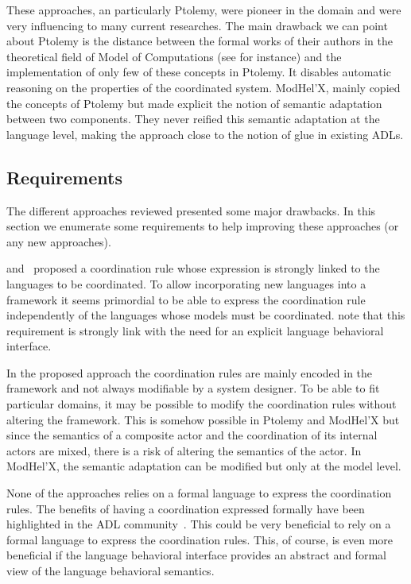 These approaches, an particularly Ptolemy, were pioneer in the domain and were very influencing to many current researches. The main drawback we can point about Ptolemy is the distance between the formal works of their authors in the theoretical field of Model of Computations (see \cite{TaggedSignal} for instance) and the implementation of only few of these concepts in Ptolemy. It disables automatic reasoning on the properties of the coordinated system. ModHel'X, mainly copied the concepts of Ptolemy but made explicit the notion of semantic adaptation between two components. They never reified this semantic adaptation at the language level, making the approach close to the notion of glue in existing ADLs.

\subsection{Requirements}

The different approaches reviewed presented some major drawbacks. In this section we enumerate some requirements to help improving these approaches (or any new approaches). 

\cite{dinatale} and~\cite{mascotbib} proposed a coordination rule whose expression is strongly linked to the languages to be coordinated. To allow incorporating new languages into a framework it seems primordial to be able to express the coordination rule independently of the languages whose models must be coordinated. note that this requirement is strongly link with the need for an explicit language behavioral interface.

In the proposed approach the coordination rules are mainly encoded in the framework and not always modifiable by a system designer. To be able to fit particular domains, it may be possible to modify the coordination rules without altering the framework. This is somehow possible in Ptolemy and ModHel'X but since the semantics of a composite actor and the coordination of its internal actors are mixed, there is a risk of altering the semantics of the actor. In ModHel'X, the semantic adaptation can be modified but only at the model level.

None of the approaches relies on a formal language to express the coordination rules. The benefits of having a coordination expressed formally have been highlighted in the ADL community~\cite{wrightbib,rapidebib}. This could be very beneficial to rely on a formal language to express the coordination rules. This, of course, is even more beneficial if the language behavioral interface provides an abstract and formal view of the language behavioral semantics.

